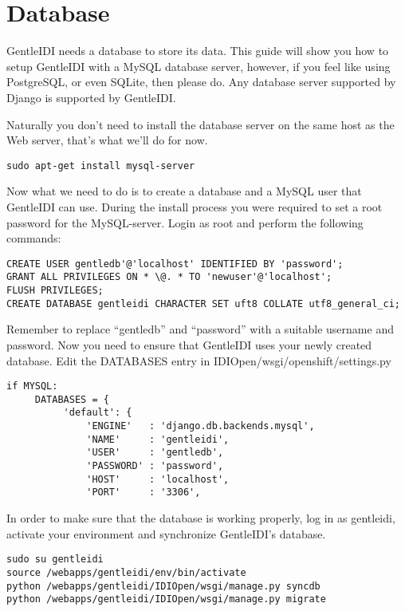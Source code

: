 \section{Database}
GentleIDI needs a database to store its data. This guide will show you
how to setup GentleIDI with a MySQL database server, however, if you
feel like using PostgreSQL, or even SQLite, then please do.
Any database server supported by Django is supported by GentleIDI.

Naturally you don't need to install the database server
on the same host as the Web server, that's what
we'll do for now.

\begin{verbatim}
sudo apt-get install mysql-server
\end{verbatim}

Now what we need to do is to create a database and a MySQL user that
GentleIDI can use. During the install process you were required to set
a root password for the MySQL-server. Login as root and perform the
following commands:

\begin{verbatim}
CREATE USER gentledb'@'localhost' IDENTIFIED BY 'password';
GRANT ALL PRIVILEGES ON * \@. * TO 'newuser'@'localhost';
FLUSH PRIVILEGES;
CREATE DATABASE gentleidi CHARACTER SET uft8 COLLATE utf8_general_ci;
\end{verbatim}

Remember to replace ``gentledb'' and ``password'' with a suitable username and
password. Now you need to ensure that GentleIDI uses your newly created
database.  Edit the DATABASES entry in IDIOpen/wsgi/openshift/settings.py

\begin{verbatim}
if MYSQL:
     DATABASES = {
          'default': {
              'ENGINE'   : 'django.db.backends.mysql',
              'NAME'     : 'gentleidi',
              'USER'     : 'gentledb',
              'PASSWORD' : 'password',
              'HOST'     : 'localhost',
              'PORT'     : '3306',
\end{verbatim}

In order to make sure that the database is working properly, log in as
gentleidi, activate your environment and synchronize
GentleIDI's database.

\begin{verbatim}
sudo su gentleidi
source /webapps/gentleidi/env/bin/activate
python /webapps/gentleidi/IDIOpen/wsgi/manage.py syncdb
python /webapps/gentleidi/IDIOpen/wsgi/manage.py migrate
\end{verbatim}

